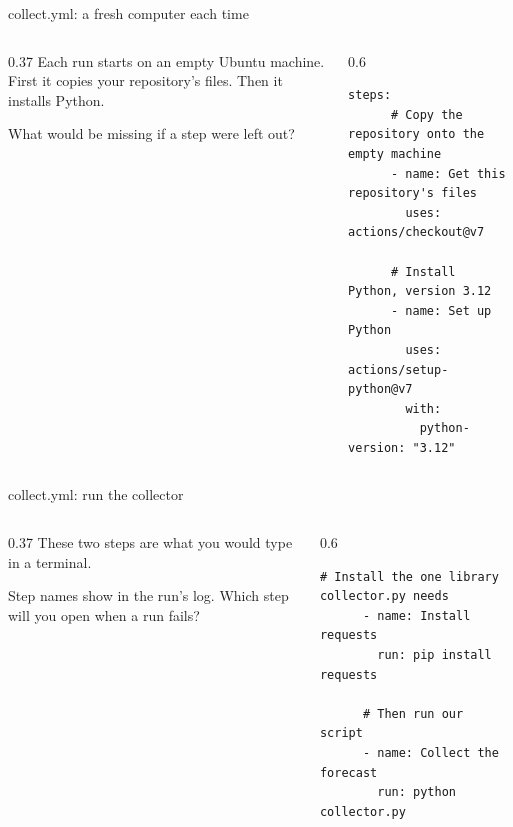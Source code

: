\documentclass[9pt,aspectratio=169]{beamer}
\begin{document}
\begin{frame}[fragile]{collect.yml: a fresh computer each time}
    \begin{columns}[T]
        \begin{column}{0.37\textwidth}
            Each run starts on an empty Ubuntu machine. First it copies your repository's files. Then it installs Python.

            \medskip
            What would be missing if a step were left out?
        \end{column}
        \begin{column}{0.6\textwidth}
\begin{lstlisting}[language={}]
    steps:
      # Copy the repository onto the empty machine
      - name: Get this repository's files
        uses: actions/checkout@v7

      # Install Python, version 3.12
      - name: Set up Python
        uses: actions/setup-python@v7
        with:
          python-version: "3.12"
\end{lstlisting}
        \end{column}
    \end{columns}
\end{frame}

\begin{frame}[fragile]{collect.yml: run the collector}
    \begin{columns}[T]
        \begin{column}{0.37\textwidth}
            These two steps are what you would type in a terminal.

            \medskip
            Step names show in the run's log. Which step will you open when a run fails?
        \end{column}
        \begin{column}{0.6\textwidth}
\begin{lstlisting}[language={}]
      # Install the one library collector.py needs
      - name: Install requests
        run: pip install requests

      # Then run our script
      - name: Collect the forecast
        run: python collector.py
\end{lstlisting}
        \end{column}
    \end{columns}
\end{frame}
\end{document}
